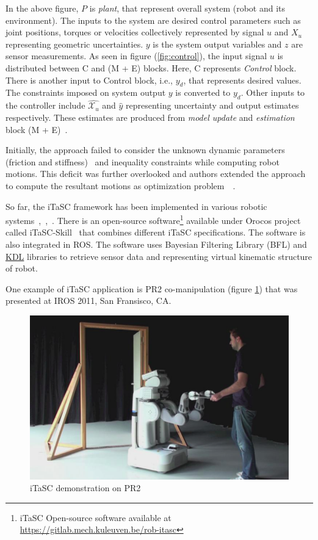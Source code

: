 In the above figure, $P$ is \textit{plant}, that represent overall system (robot and its environment). The inputs to the system are desired control parameters such as joint positions, torques or velocities collectively represented by signal $u$ and $X_u$ representing geometric uncertainties. $y$ is the system output variables and $z$ are sensor measurements. As seen in figure (\ref{fig:control}), the input signal $u$ is distributed between C and (M + E) blocks. Here, C represents \textit{Control} block. There is another input to Control block, i.e., $y_d$, that represents desired values. The constraints imposed on system output $y$ is converted to $y_d$. Other inputs to the controller include $\widehat{ \mathcal{X}_u}$ and $\widehat y$ representing uncertainty and output estimates respectively. These estimates are produced from \textit{model update} and \textit{estimation} block (M + E)~\cite{de2007constraint}.

Initially, the approach failed to consider the unknown dynamic parameters (friction and stiffness)~\cite{de2007constraint} and inequality constraints while computing robot motions. This deficit was further overlooked and authors extended the approach to compute the resultant motions as optimization problem~\cite{decre2013extending}~\cite{decre2009extending}. 

So far, the iTaSC framework has been implemented in various robotic systems~\cite{han2017interaction},~\cite{vanthienen2011itasc},~\cite{somani2016task}. There is an open-source software\footnote{iTaSC Open-source software available at \url{https://gitlab.mech.kuleuven.be/rob-itasc}} available under Orocos project called iTaSC-Skill~\cite{itasc-software} that combines different iTaSC specifications. The software is also integrated in ROS. The software uses Bayesian Filtering Library (BFL) and \hyperref[kdl]{KDL} libraries to retrieve sensor data and representing virtual kinematic structure of robot. 

One example of iTaSC application is PR2 co-manipulation (figure \ref{fig:pr2}) that was presented at IROS 2011, San Fransisco, CA. 

\begin{figure}[h]
	\begin{center}
		\includegraphics[scale=0.5]{images/PR2.png}
	\end{center}
	\caption{iTaSC demonstration on PR2}
	\label{fig:pr2}
\end{figure}

